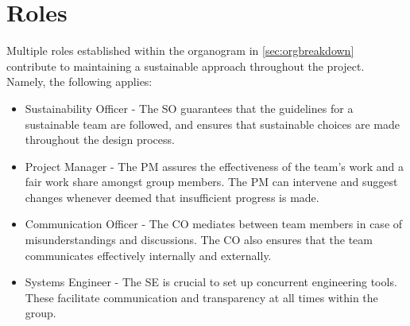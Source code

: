 \section{Roles}\label{sec:roles}
Multiple roles established within the organogram in \cref{sec:orgbreakdown} contribute to maintaining a sustainable approach throughout the project.
Namely, the following applies:
\begin{itemize}
    \item Sustainability Officer - The SO guarantees that the guidelines for a sustainable team are followed, and ensures that sustainable choices are made throughout the design process.

    \item Project Manager - The PM assures the effectiveness of the team's work and a fair work share amongst group members.
    The PM can intervene and suggest changes whenever deemed that insufficient progress is made.
    
    \item Communication Officer - The CO mediates between team members in case of misunderstandings and discussions.
    The CO also ensures that the team communicates effectively internally and externally.

    \item Systems Engineer - The SE is crucial to set up concurrent engineering tools.
    These facilitate communication and transparency at all times within the group.
\end{itemize}

